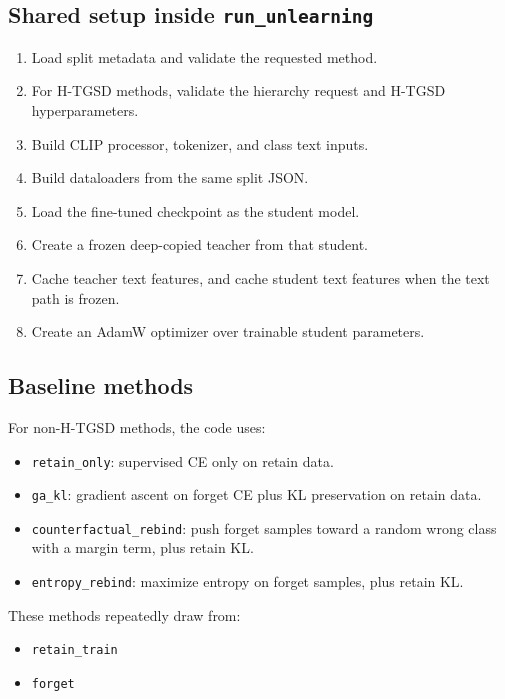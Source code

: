 \documentclass[10pt,a4paper]{article}
\begin{document}
\subsection{Shared setup inside \texttt{run\_unlearning}}
\begin{enumerate}
  \item Load split metadata and validate the requested method.
  \item For H-TGSD methods, validate the hierarchy request and H-TGSD hyperparameters.
  \item Build CLIP processor, tokenizer, and class text inputs.
  \item Build dataloaders from the same split JSON.
  \item Load the fine-tuned checkpoint as the student model.
  \item Create a frozen deep-copied teacher from that student.
  \item Cache teacher text features, and cache student text features when the text path is frozen.
  \item Create an AdamW optimizer over trainable student parameters.
\end{enumerate}

\subsection{Baseline methods}
For non-H-TGSD methods, the code uses:
\begin{itemize}
  \item \texttt{retain\_only}: supervised CE only on retain data.
  \item \texttt{ga\_kl}: gradient ascent on forget CE plus KL preservation on retain data.
  \item \texttt{counterfactual\_rebind}: push forget samples toward a random wrong class with a margin term, plus retain KL.
  \item \texttt{entropy\_rebind}: maximize entropy on forget samples, plus retain KL.
\end{itemize}

These methods repeatedly draw from:
\begin{itemize}
  \item \texttt{retain\_train}
  \item \texttt{forget}
\end{itemize}
\end{document}
